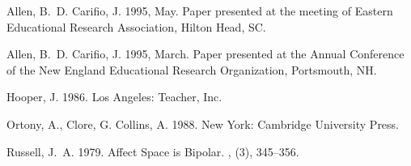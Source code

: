 \documentclass[11pt]{article}
\begin{document}
\citep{hooper1986,ortony1988,russell1979} 
\citet{allen1995a}
\citet[in][chap.~3]{allen1995a}
\citeauthor{allen1995b}
\citeyear{allen1995b}
\citeyearpar{allen1995b}

%

\begin{thebibliography}{}

Allen, B.~D.\BCBT{} \BBA{} Carifio, J.
\newblock{}\BBOP{}1995\protect{}, May\BBCP{}.
\newblock{}
\newblock{}Paper presented at the meeting of Eastern Educational Research
  Association, Hilton Head, SC.

Allen, B.~D.\BCBT{} \BBA{} Carifio, J.
\newblock{}\BBOP{}1995\protect{}, March\BBCP{}.
\newblock{}
\newblock{}Paper presented at the Annual Conference of the New England
  Educational Research Organization, Portsmouth, NH.

Hooper, J.
\newblock{}\BBOP{}1986\BBCP{}.
\newblock{}
\newblock{}Los Angeles: Teacher, Inc.

Ortony, A., Clore, G.\BCBL{} \BBA{} Collins, A.
\newblock{}\BBOP{}1988\BBCP{}.
\newblock{}
\newblock{}New York: Cambridge University Press.

Russell, J.~A.
\newblock{}\BBOP{}1979\BBCP{}.
\newblock{}\BBOQ{}Affect {S}pace is {B}ipolar.\BBCQ{}
\newblock{}, (3),
  345--356.

\end{thebibliography}
\end{document}
